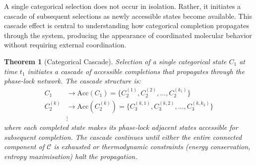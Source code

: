 \documentclass[12pt,a4paper]{article}
\newtheorem{theorem}{Theorem}[section]
\theoremstyle{definition}
\theoremstyle{remark}
\newcommand{\catspace}{\mathcal{C}}
\newcommand{\accessible}{\text{Acc}}
\begin{document}
A single categorical selection does not occur in isolation. Rather, it initiates a cascade of subsequent selections as newly accessible states become available. This cascade effect is central to understanding how categorical completion propagates through the system, producing the appearance of coordinated molecular behavior without requiring external coordination.

\begin{theorem}[Categorical Cascade]
\label{thm:categorical_cascade}
Selection of a single categorical state $C_1$ at time $t_1$ initiates a cascade of accessible completions that propagates through the phase-lock network. The cascade structure is:
\begin{align}
C_1 &\to \accessible(C_1) = \{C_2^{(1)}, C_2^{(2)}, \ldots, C_2^{(k_1)}\} \label{eq:cascade_step1}\\
C_2^{(k)} &\to \accessible(C_2^{(k)}) = \{C_3^{(k,1)}, C_3^{(k,2)}, \ldots, C_3^{(k,k_2)}\} \label{eq:cascade_step2}\\
&\vdots \nonumber
\end{align}
where each completed state makes its phase-lock adjacent states accessible for subsequent completion. The cascade continues until either the entire connected component of $\catspace$ is exhausted or thermodynamic constraints (energy conservation, entropy maximisation) halt the propagation.
\end{theorem}
\end{document}

